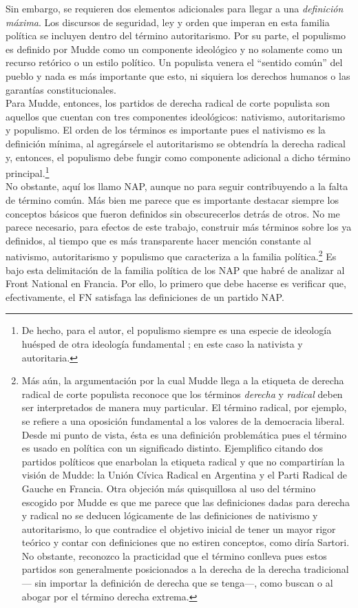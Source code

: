 Sin embargo, se requieren dos elementos adicionales para llegar a una \textit{definición máxima}. Los discursos de seguridad, ley y orden que imperan en esta familia política se incluyen dentro del término autoritarismo. Por su parte, el populismo es definido por Mudde como un componente ideológico y no solamente como un recurso retórico o un estilo político. Un populista venera el ``sentido común'' del pueblo y nada es más importante que esto, ni siquiera los derechos humanos o las garantías constitucionales.\\

Para Mudde, entonces, los partidos de derecha radical de corte populista son aquellos que cuentan con tres componentes ideológicos: nativismo, autoritarismo y populismo. El orden de los términos es importante pues el nativismo es la definición mínima, al agregársele el autoritarismo se obtendría la derecha radical y, entonces, el populismo debe fungir como componente adicional a dicho término principal.\footnote{De hecho, para el autor, el populismo siempre es una especie de ideología huésped de otra ideología fundamental \parencite{MuddeRovira17}; en este caso la nativista y autoritaria.}\\ 

No obstante, aquí los llamo NAP, aunque no para seguir contribuyendo a la falta de término común. Más bien me parece que es importante destacar siempre los conceptos básicos que fueron definidos sin obscurecerlos detrás de otros. No me parece necesario, para efectos de este trabajo, construir más términos sobre los ya definidos, al tiempo que es más transparente hacer mención constante al nativismo, autoritarismo y populismo que caracteriza a la familia política.\footnote{Más aún, la argumentación por la cual Mudde llega a la etiqueta de derecha radical de corte populista reconoce que los términos \textit{derecha} y \textit{radical} deben ser interpretados de manera muy particular. El término radical, por ejemplo, se refiere a una oposición fundamental a los valores de la democracia liberal. Desde mi punto de vista, ésta es una definición problemática pues el término es usado en política con un significado distinto. Ejemplifico citando dos partidos políticos que enarbolan la etiqueta radical y que no compartirían la visión de Mudde: la Unión Cívica Radical en Argentina y el Parti Radical de Gauche en Francia. Otra objeción más quisquillosa al uso del término escogido por Mudde es que me parece que las definiciones dadas para derecha y radical no se deducen lógicamente de las definiciones de nativismo y autoritarismo, lo que contradice el objetivo inicial de tener un mayor rigor teórico y contar con definiciones que no estiren conceptos, como diría Sartori. No obstante, reconozco la practicidad que el término conlleva pues estos partidos son generalmente posicionados a la derecha de la derecha tradicional--- sin importar la definición de derecha que se tenga---, como buscan \textcite{Mammone12} o \textcite{Hainsworth16a} al abogar por el término derecha extrema.} Es bajo esta delimitación de la familia política de los NAP que habré de analizar al Front National en Francia. Por ello, lo primero que debe hacerse es verificar que, efectivamente, el FN satisfaga las definiciones de un partido NAP. 


